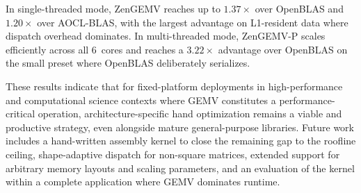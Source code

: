\documentclass[conference]{IEEEtran}
\begin{document}
In single-threaded mode, ZenGEMV reaches up to $1.37\times$ over OpenBLAS and
$1.20\times$ over AOCL-BLAS, with the largest advantage on L1-resident data
where dispatch overhead dominates. In multi-threaded mode, ZenGEMV-P scales
efficiently across all 6~cores and reaches a $3.22\times$ advantage over
OpenBLAS on the small preset where OpenBLAS deliberately serializes.

These results indicate that for fixed-platform deployments in high-performance
and computational science contexts where GEMV constitutes a performance-critical
operation, architecture-specific hand optimization remains a viable and productive
strategy, even alongside mature general-purpose libraries. Future work includes a
hand-written assembly kernel to close the remaining gap to the roofline ceiling,
shape-adaptive dispatch for non-square matrices, extended support for
arbitrary memory layouts and scaling parameters, and an evaluation of the kernel
within a complete application where GEMV dominates runtime.

\balance
\end{document}
